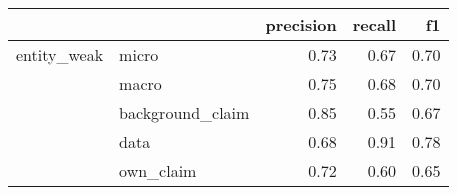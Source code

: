 \begin{tabular}{llrrr}
\toprule
            &           &  precision &  recall &   f1 \\
\midrule
entity\_weak & micro &       0.73 &    0.67 & 0.70 \\
            & macro &       0.75 &    0.68 & 0.70 \\
            & background\_claim &       0.85 &    0.55 & 0.67 \\
            & data &       0.68 &    0.91 & 0.78 \\
            & own\_claim &       0.72 &    0.60 & 0.65 \\
\bottomrule
\end{tabular}
